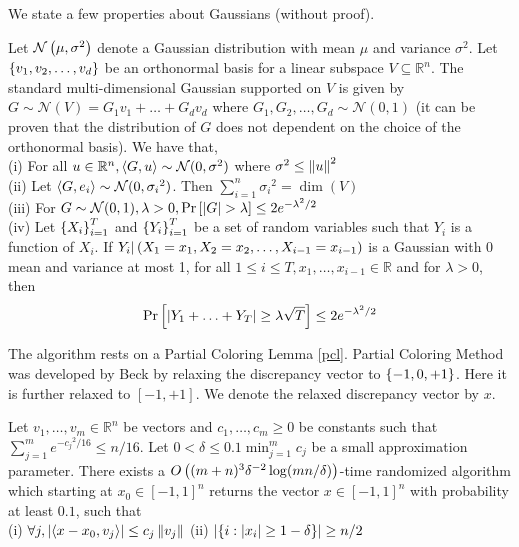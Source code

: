 We state a few properties about Gaussians (without proof).
\begin{Claim} \label{gaussian_properties}
Let $\mathcal{N}\left(\mu,{\sigma}^2 \right )$ denote a Gaussian distribution with mean $\mu$ and variance ${\sigma}^2$. Let $\left\{v_1,v_2,\hdots,v_d\right\}$ be an orthonormal basis for a linear subspace $V \subseteq \mathbb{R}^n$.
The standard multi-dimensional Gaussian supported on $V$ is given by $G \sim \mathcal{N}(V) = G_1v_1 + \hdots + G_dv_d$ where $G_1,G_2,\hdots,G_d \sim \mathcal{N}(0,1)$
(it can be proven that the distribution of $G$ does not dependent on the choice of the orthonormal basis).
We have that,\\
(i) For all $u \in \mathbb{R}^n, \left\langle G,u\right\rangle \sim \mathcal{N}(0,{\sigma}^2)$ where ${\sigma}^2 \leq \left\lVert u \right\rVert^2$\\
(ii) Let $\left\langle G,e_i\right\rangle \sim \mathcal{N}(0,{\sigma_i}^2)$.
Then $\sum_{i=1}^{n}{\sigma_i}^2 = \dim(V)$\\
(iii) For $G \sim \mathcal{N}(0,1), \lambda >0, \Pr\left[\left\lvert G \right\rvert>\lambda\right] \leq 2e^{-{\lambda}^2/2} $\\
(iv) Let $\left\{X_i\right\}_{i=1}^{T}$ and $\left\{Y_i\right\}_{i=1}^{T}$ be a set of random variables such that $Y_i$ is a function of $X_i$. If $Y_i|\left(X_1 = x_1,X_2=x_2,\hdots,X_{i-1}=x_{i-1} \right )$ is a Gaussian with 0 mean and variance at most 1, for all $1 \leq i \leq T,x_1,\hdots,x_{i-1}\in \mathbb{R}$ and for $\lambda > 0$, then
\[ \Pr\left[\left\lvert Y_1 + \hdots + Y_T \right\rvert \geq \lambda\sqrt{T}\right] \leq 2e^{-{\lambda}^2/2} \]
\end{Claim}

The algorithm rests on a Partial Coloring Lemma \ref{pcl}. Partial Coloring Method was developed by Beck \cite{Beck1981} by relaxing the discrepancy vector to $\left\{-1,0,+1\right\}$. Here it is further relaxed to $\left[-1,+1\right]$.
We denote the relaxed discrepancy vector by $x$.

\begin{lemma} \label{pcl}
Let $v_1,\hdots,v_m \in \mathbb{R}^n$ be vectors and $c_1,\hdots,c_m \geq 0$ be constants such that
$\sum_{j=1}^{m}e^{{-c_j}^2/16} \leq n/16$.
Let $0 < \delta \le 0.1\min_{j=1}^m c_j$ be a small approximation parameter.
There exists a $O\left((m+n)^3{\delta}^{-2}\log(mn/\delta) \right )$-time randomized algorithm
which starting at $x_0 \in [-1,1]^n$ returns the vector $x \in [-1,1]^n$
with probability at least $0.1$, such that\\
\qquad (i) $\forall j, \left\lvert \left\langle x-x_0,v_j\right\rangle \right\rvert \leq c_j\left\lVert v_j \right\rVert$ \qquad \qquad \qquad \qquad
(ii) $\left\lvert \left\{i: \left\lvert x_i \right\rvert \geq 1- \delta\right\} \right\rvert \geq n/2$
\end{lemma}

